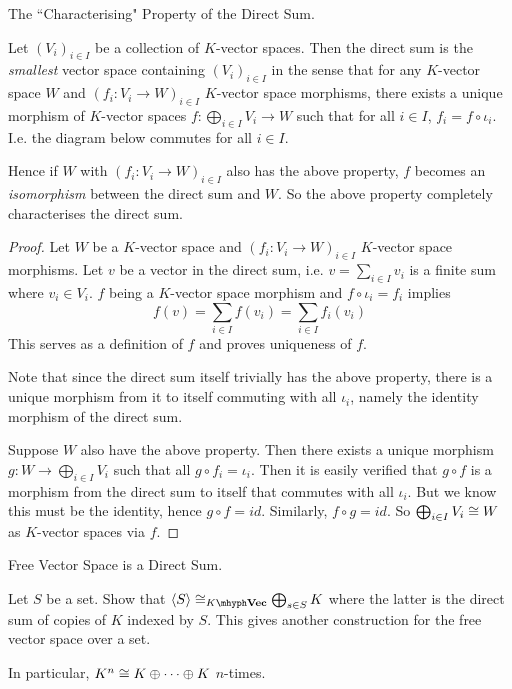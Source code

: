 \documentclass[../book.tex]{subfiles}
\begin{document}
\begin{thm} The ``Characterising" Property of the Direct Sum.
    
    Let $(V_i)_{i\in I}$ be a collection of $K$-vector spaces.
    Then the direct sum is the \emph{smallest} vector space 
    containing $(V_i)_{i\in I}$ in the sense that
    for any $K$-vector space $W$ and 
    $(f_i : V_i \to W)_{i\in I}$ $K$-vector space morphisms,
    there exists a unique morphism of $K$-vector spaces 
    $f : \bigoplus_{i\in I} V_i \to W$ such that for all $i\in I$, 
    $f_i = f \circ \iota_i$. 
    I.e. the diagram below commutes for all $i \in I$.  
    \begin{figure} [ht]
        \centering
    \end{figure}
    
    Hence if $W$ with $(f_i : V_i \to W)_{i\in I}$ also has the above property,
    $f$ becomes an \emph{isomorphism} between the direct sum and $W$.
    So the above property completely characterises the direct sum. 
\end{thm}
\begin{proof}
    Let $W$ be a $K$-vector space and 
    $(f_i : V_i \to W)_{i\in I}$ $K$-vector space morphisms.
    Let $v$ be a vector in the direct sum, 
    i.e. $v = \sum_{i\in I} v_i$ is a finite sum where $v_i \in V_i$. 
    $f$ being a $K$-vector space morphism and $f \circ \iota_i = f_i$ implies \[
        f(v) = \sum_{i\in I} f(v_i) = \sum_{i\in I} f_i(v_i)
    \]
    This serves as a definition of $f$ and proves uniqueness of $f$. 
    
    Note that since the direct sum itself trivially has the above property, 
    there is a unique morphism from it to itself commuting with all $\iota_i$,
    namely the identity morphism of the direct sum. 
    
    Suppose $W$ also have the above property. 
    Then there exists a unique morphism $g : W \to \bigoplus_{i\in I} V_i$
    such that all $g \circ f_i = \iota_i$. 
    Then it is easily verified that $g \circ f$ is a morphism 
    from the direct sum to itself that commutes with all $\iota_i$.
    But we know this must be the identity, hence $g \circ f = id$. 
    Similarly, $f \circ g = id$. 
    So $\bigoplus_{i\in I} V_i \cong W$ as $K$-vector spaces via $f$. 
\end{proof}
\begin{ex} Free Vector Space is a Direct Sum.
    
    Let $S$ be a set. 
    Show that $\<S\> \iso_{\KVec} \bigoplus_{s\in S} K$ where the latter is
    the direct sum of copies of $K$ indexed by $S$. 
    This gives another construction for the free vector space over a set. 
    
    In particular, $K^n \cong K \oplus \cdots \oplus K$ $n$-times. 
\end{ex}
\end{document}
